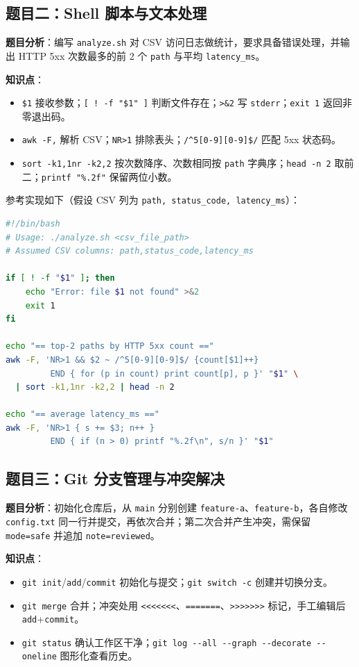 \documentclass[a4paper, 12pt]{article}
\begin{document}
\subsection{题目二：Shell 脚本与文本处理}

\textbf{题目分析}：编写 \texttt{analyze.sh} 对 CSV 访问日志做统计，要求具备错误处理，并输出 HTTP 5xx 次数最多的前 2 个 \texttt{path} 与平均 \texttt{latency\_ms}。

\textbf{知识点}：
\begin{itemize}
  \item \texttt{\$1} 接收参数；\texttt{[ ! -f "\$1" ]} 判断文件存在；\texttt{>\&2} 写 \texttt{stderr}；\texttt{exit 1} 返回非零退出码。
  \item \texttt{awk -F,} 解析 CSV；\texttt{NR>1} 排除表头；\verb|/^5[0-9][0-9]$/| 匹配 5xx 状态码。
  \item \texttt{sort -k1,1nr -k2,2} 按次数降序、次数相同按 \texttt{path} 字典序；\texttt{head -n 2} 取前二；\texttt{printf "\%.2f"} 保留两位小数。
\end{itemize}

参考实现如下（假设 CSV 列为 \texttt{path, status\_code, latency\_ms}）：

\begin{lstlisting}[language=bash]
#!/bin/bash
# Usage: ./analyze.sh <csv_file_path>
# Assumed CSV columns: path,status_code,latency_ms

if [ ! -f "$1" ]; then
    echo "Error: file $1 not found" >&2
    exit 1
fi

echo "== top-2 paths by HTTP 5xx count =="
awk -F, 'NR>1 && $2 ~ /^5[0-9][0-9]$/ {count[$1]++}
         END { for (p in count) print count[p], p }' "$1" \
  | sort -k1,1nr -k2,2 | head -n 2

echo "== average latency_ms =="
awk -F, 'NR>1 { s += $3; n++ }
         END { if (n > 0) printf "%.2f\n", s/n }' "$1"
\end{lstlisting}

\subsection{题目三：Git 分支管理与冲突解决}

\textbf{题目分析}：初始化仓库后，从 \texttt{main} 分别创建 \texttt{feature-a}、\texttt{feature-b}，各自修改 \texttt{config.txt} 同一行并提交，再依次合并；第二次合并产生冲突，需保留 \texttt{mode=safe} 并追加 \texttt{note=reviewed}。

\textbf{知识点}：
\begin{itemize}
  \item \texttt{git init}/\texttt{add}/\texttt{commit} 初始化与提交；\texttt{git switch -c} 创建并切换分支。
  \item \texttt{git merge} 合并；冲突处用 \texttt{<<<<<<<}、\texttt{=======}、\texttt{>>>>>>>} 标记，手工编辑后 \texttt{add}+\texttt{commit}。
  \item \texttt{git status} 确认工作区干净；\texttt{git log -{}-all -{}-graph -{}-decorate -{}-oneline} 图形化查看历史。
\end{itemize}
\end{document}
